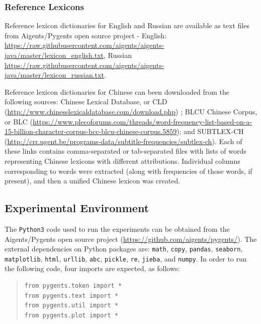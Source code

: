 \documentclass[11pt]{article}
\begin{document}
\subsubsection{Reference Lexicons}

Reference lexicon dictionaries for English and Russian are available as text files from Aigents/Pygents open source project - English: \url{https://raw.githubusercontent.com/aigents/aigents-java/master/lexicon_english.txt}, Russian \url{https://raw.githubusercontent.com/aigents/aigents-java/master/lexicon_russian.txt}.

Reference lexicon dictionaries for Chinese can been downloaded from the following sources: Chinese Lexical Database, or CLD (\url{http://www.chineselexicaldatabase.com/download.php}) \citep[see][]{16};  BLCU Chinese Corpus, or BLC (\url{https://www.plecoforums.com/threads/word-frequency-list-based-on-a-15-billion-character-corpus-bcc-blcu-chinese-corpus.5859}); and SUBTLEX-CH (\url{http://crr.ugent.be/programs-data/subtitle-frequencies/subtlex-ch}). Each of these links contains comma-separated or tab-separated files with lists of words representing Chinese lexicons with different attributions. Individual columns corresponding to words were extracted (along with frequencies of those words, if present), and then a unified Chinese lexicon was created.

\subsection{Experimental Environment}

The \texttt{Python3} code used to run the experiments can be obtained from the Aigents/Pygents open source project (\url{https://github.com/aigents/pygents/}). The external dependencies on Python packages are: \texttt{math}, \texttt{copy}, \texttt{pandas}, \texttt{seaborn}, \texttt{matplotlib}, \texttt{html}, \texttt{urllib}, \texttt{abc}, \texttt{pickle}, \texttt{re}, \texttt{jieba}, and \texttt{numpy}. In order to run the following code, four imports are expected, as follows:

\begin{quote}\begin{small}
\begin{verbatim}
from pygents.token import *
from pygents.text import *
from pygents.util import *
from pygents.plot import *
\end{verbatim}
\end{small}\end{quote}
\end{document}
